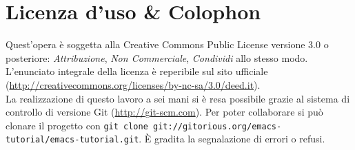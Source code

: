 \documentclass[11pt,a4paper]{article}
\begin{document}
\vfill
{}
{}
\section*{Licenza d'uso \& Colophon}
\label{sec:lic}

Quest'opera è soggetta alla Creative Commons Public License versione 3.0 o
posteriore: \emph{Attribuzione}, \emph{Non Commerciale}, \emph{Condividi} allo
stesso modo. L'enunciato integrale della licenza è reperibile sul sito ufficiale
(\url{http://creativecommons.org/licenses/by-nc-sa/3.0/deed.it}).\\%

\noindent La realizzazione di questo lavoro a sei mani si è resa possibile
grazie al sistema di controllo di versione Git (\url{http://git-scm.com}). Per
poter collaborare si può clonare il progetto con %
\verb!git clone git://gitorious.org/emacs-tutorial/emacs-tutorial.git!. È
gradita la segnalazione di errori o refusi.
\end{document}
